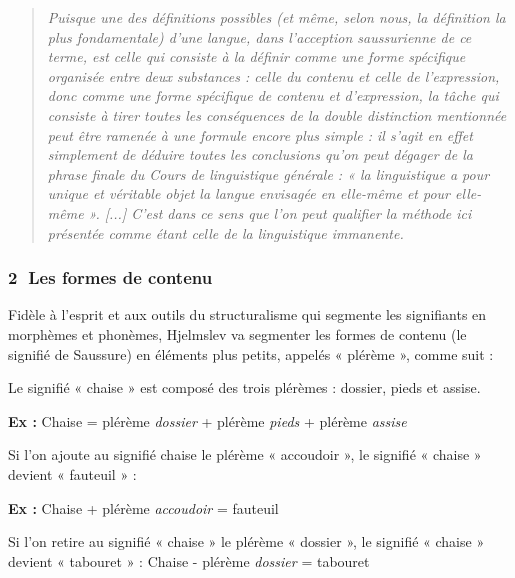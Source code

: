 \begin{quote}\small\itshape
Puisque une des définitions possibles (et même, selon nous, la définition la plus fondamentale) d’une langue, dans l’acception saussurienne de ce terme, est celle qui consiste à la définir comme une forme spécifique organisée entre deux substances : celle du contenu et celle de l’expression, donc comme une forme spécifique de contenu et d’expression, la tâche qui consiste à tirer toutes les conséquences de la double distinction mentionnée peut être ramenée à une formule encore plus simple : il s’agit en effet simplement de déduire toutes les conclusions qu’on peut dégager de la phrase finale du Cours de linguistique générale : « la linguistique a pour unique et véritable objet la langue envisagée en elle-même et pour elle-même ». [...] C’est dans ce sens que l’on peut qualifier la méthode ici présentée comme étant celle de la linguistique immanente.
\end{quote}

\subsubsection*{\textcircled{\scriptsize 2} Les formes de contenu}
Fidèle à l’esprit et aux outils du structuralisme qui segmente les signifiants en morphèmes et phonèmes, Hjelmslev va segmenter les formes de contenu (le signifié de Saussure) en éléments plus petits, appelés « plérème », comme suit :

Le signifié « chaise » est composé des trois plérèmes : dossier, pieds et assise.

\noindent\textbf{Ex :} Chaise = plérème \textit{dossier} + plérème \textit{pieds} + plérème \textit{assise}

Si l’on ajoute au signifié chaise le plérème « accoudoir », le signifié « chaise » devient « fauteuil » :

\noindent\textbf{Ex :} Chaise + plérème \textit{accoudoir} = fauteuil

Si l’on retire au signifié « chaise » le plérème « dossier », le signifié « chaise » devient « tabouret » :
\noindent Chaise - plérème \textit{dossier} = tabouret

